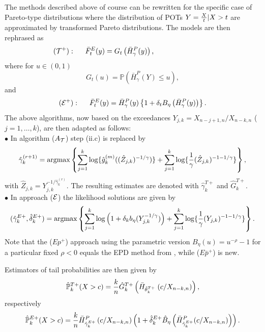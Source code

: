 \vspace{0.5cm}\noindent
The methods described above of course can be rewritten for the specific case of Pareto-type distributions where the distribution of POTs $Y={X \over t}|X>t$ are approximated by transformed Pareto distributions. The models are then rephrased as 
 \[\hspace{-2.9cm} ({\cal{T}^+}): \hspace{0.5cm}
\bar{F}^E_t (y) = G_t \left(\bar{H}^{P}_{\gamma}(y)\right),
\]
where for $u \in (0,1)$ 
\begin{equation*}
G_t (u) = \mathbb{P} \left(\bar{H}^{P}_{\gamma}(Y) \leq u\right),
\end{equation*} 
and
\[
({\cal{E}^+}) : \hspace{0.5cm} \bar{F}^E_t(y)= \bar{H}^{P}_\gamma (y)\left\{1 +\delta_t B_{\eta} \left( \bar{H}^{P}_\gamma (y) \right) \right\}. 
\]
The above algorithms, now based on the exceedances $Y_{j,k}= X_{n-j+1,n}/X_{n-k,n}$ ($j=1,\ldots,k$), are then adapted as follows:\\
$\bullet$ In algorithm ($A_{\cal T}$) step (ii.c) is replaced by 
\[
\hat{\gamma}_k^{(r+1)}=
\mbox{argmax} \left\{
\sum_{j=1}^k \log \{ \hat{g}^{(m)}_k ( (\hat{Z}_{j,k})^{-1/\gamma})\} + \sum_{j=1}^k
\log \{{1 \over \gamma}(\hat{Z}_{j,k})^{-1-1/\gamma} \} \right\},
\]
with $ \hat{Z}_{j,k}= Y_{j,k}^{-1/\hat{\gamma}_k^{(r)}} $. 
The resulting estimates are denoted with $\hat{\gamma}^{T+}_{k}$ and $\hat{G}^{T+}_k $.
 \\
$\bullet$ In approach (${\cal E}$) the likelihood solutions are given by
\begin{equation}
(\hat{\gamma}^{E+}_k, \hat{\delta}^{E+}_k)=
\mbox{argmax} \left\{
\sum_{j=1}^k \log\left( 
1+\delta_k b_{\eta}(Y_{j,k}^{-1/\gamma}) \right)+
 \sum_{j=1}^k
\log \{{1 \over \gamma} (Y_{j,k})^{-1-1/\gamma} \}
 \right\}.
\label{E+}
\end{equation}
Note that the ($Ep^+$) approach using the parametric version $B_\eta (u) = u^{-\rho}-1$ for a particular fixed $\rho <0$ equals the EPD method from \cite{beirlant2009second}, while ($E\bar{p}^+$) is new.

\vspace{0.2cm}\noindent
Estimators of tail probabilities are then given by 
\[
\hat{\mathbb{P}}_k^{T+}(X>c) = {k \over n} \hat{G}^{T+}_k 
\left( \bar{H}_{\hat{\theta}^{T+}_k} \; (c/X_{n-k,n})\right),
\]
respectively
\[
\hat{\mathbb{P}}_k^{E+}(X>c) = {k \over n} \bar{H}^{P}_{\hat{\gamma}^{E+}_k}\left( c/X_{n-k,n} \right) 
\left( 1+ \hat{\delta}_k^{E+} \hat{B}_{\eta}\left(\bar{H}^{P}_{\hat{\gamma}^{E+}_k} (c/X_{n-k,n})\right)\right).
\]
 

